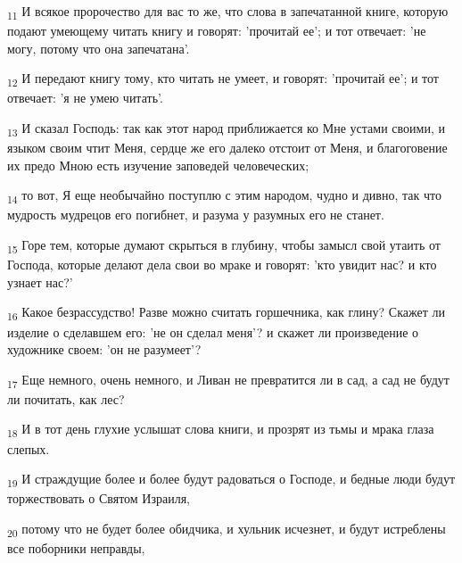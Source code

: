 \begin{tcolorbox}
\textsubscript{11} И всякое пророчество для вас то же, что слова в запечатанной книге, которую подают умеющему читать книгу и говорят: 'прочитай ее'; и тот отвечает: 'не могу, потому что она запечатана'.
\end{tcolorbox}
\begin{tcolorbox}
\textsubscript{12} И передают книгу тому, кто читать не умеет, и говорят: 'прочитай ее'; и тот отвечает: 'я не умею читать'.
\end{tcolorbox}
\begin{tcolorbox}
\textsubscript{13} И сказал Господь: так как этот народ приближается ко Мне устами своими, и языком своим чтит Меня, сердце же его далеко отстоит от Меня, и благоговение их предо Мною есть изучение заповедей человеческих;
\end{tcolorbox}
\begin{tcolorbox}
\textsubscript{14} то вот, Я еще необычайно поступлю с этим народом, чудно и дивно, так что мудрость мудрецов его погибнет, и разума у разумных его не станет.
\end{tcolorbox}
\begin{tcolorbox}
\textsubscript{15} Горе тем, которые думают скрыться в глубину, чтобы замысл свой утаить от Господа, которые делают дела свои во мраке и говорят: 'кто увидит нас? и кто узнает нас?'
\end{tcolorbox}
\begin{tcolorbox}
\textsubscript{16} Какое безрассудство! Разве можно считать горшечника, как глину? Скажет ли изделие о сделавшем его: 'не он сделал меня'? и скажет ли произведение о художнике своем: 'он не разумеет'?
\end{tcolorbox}
\begin{tcolorbox}
\textsubscript{17} Еще немного, очень немного, и Ливан не превратится ли в сад, а сад не будут ли почитать, как лес?
\end{tcolorbox}
\begin{tcolorbox}
\textsubscript{18} И в тот день глухие услышат слова книги, и прозрят из тьмы и мрака глаза слепых.
\end{tcolorbox}
\begin{tcolorbox}
\textsubscript{19} И страждущие более и более будут радоваться о Господе, и бедные люди будут торжествовать о Святом Израиля,
\end{tcolorbox}
\begin{tcolorbox}
\textsubscript{20} потому что не будет более обидчика, и хульник исчезнет, и будут истреблены все поборники неправды,
\end{tcolorbox}
